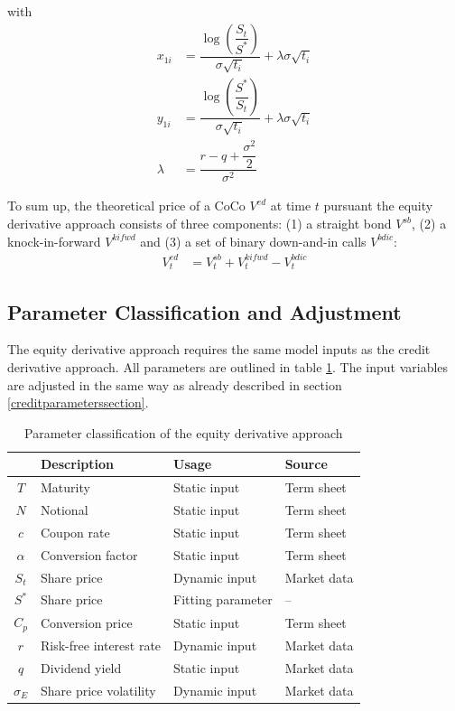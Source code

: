 with 
\begin{align*}
x_{1i} &= \dfrac{\log \left( \dfrac{S_t}{S^*} \right)}{\sigma \sqrt{t_i}} + \lambda \sigma \sqrt{t_i}\\
y_{1i} &= \dfrac{\log \left( \dfrac{S^*}{S_t} \right)}{\sigma \sqrt{t_i}} + \lambda \sigma \sqrt{t_i}\\
\lambda &= \dfrac{r-q+\dfrac{\sigma^2}{2}}{\sigma^2}
\end{align*}

To sum up, the theoretical price of a CoCo $V^{ed}$ at time $t$ pursuant the equity derivative approach consists of three components: (1) a straight bond $V^{sb}$, (2) a knock-in-forward $V^{kifwd}$ and (3) a set of binary down-and-in calls $V^{bdic}$:
\begin{align}
V^{ed}_t &= V^{sb}_t + V_t^{kifwd} - V_{t}^{bdic}
\end{align}

\subsection{Parameter Classification and Adjustment}

The equity derivative approach requires the same model inputs as the credit derivative approach. All parameters are outlined in table \ref{equityparameters}. The input variables are adjusted in the same way as already described in section \ref{creditparameterssection}.

\begin{table}[H]
 \setlength{\extrarowheight}{2.5pt}
 \centering
 \begin{tabular}{clll}
  \toprule
    & \textbf{Description} & \textbf{Usage} & \textbf{Source} \\ 
  \midrule
   $T$ & Maturity & Static input & Term sheet \\
   $N$ & Notional & Static input & Term sheet \\   
   $c$ & Coupon rate & Static input & Term sheet \\
   $\alpha$ & Conversion factor & Static input & Term sheet \\
   $S_t$ & Share price & Dynamic input & Market data \\
   $S^*$ & Share price & Fitting parameter & -- \\
   $C_p$ & Conversion price & Static input & Term sheet \\
   $r$ & Risk-free interest rate & Dynamic input & Market data \\
   $q$ & Dividend yield & Static input & Market data\\
   $\sigma_E$& Share price volatility & Dynamic input & Market data \\
  \bottomrule
 \end{tabular}
 \caption[Parameter classification of the equity derivative approach]{Parameter classification of the equity derivative approach \citep{wilkens2014contingent}}
 \label{equityparameters}
\end{table}

